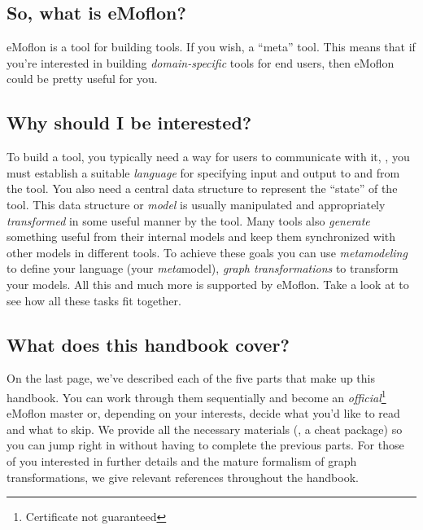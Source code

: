 \subsection*{So, what is eMoflon?}

eMoflon is a tool for building tools.
If you wish, a \enquote{meta} tool. 
This means that if you're interested in building \emph{domain-specific} tools for end users, then eMoflon could be pretty useful for you.


\subsection*{Why should I be interested?}

To build a tool, you typically need a way for users to communicate with it, \idest, you must establish a suitable \emph{language} for specifying input and output to and from the tool.
You also need a central data structure to represent the \enquote{state} of the tool.
This data structure or \emph{model} is usually manipulated and appropriately \emph{transformed} in some useful manner by the tool.
Many tools also \emph{generate} something useful from their internal models and keep them synchronized with other models in different tools.
To achieve these goals you can use \emph{metamodeling} to define your language (your \emph{meta}model), \emph{graph transformations} to transform your models.
All this and much more is supported by eMoflon.
Take a look at  to see how all these tasks fit together.

\subsection*{What does this handbook cover?}

On the last page, we've described each of the five parts that make up this handbook.
You can work through them sequentially and become an \emph{official}\footnote{Certificate not guaranteed} eMoflon master or, depending on your interests, decide what you'd like to read and what to skip.
We provide all the necessary materials (\idest, a cheat package) so you can jump right in without having to complete the previous parts. 
For those of you interested in further details and the mature formalism of graph transformations, we give relevant references throughout the handbook.

